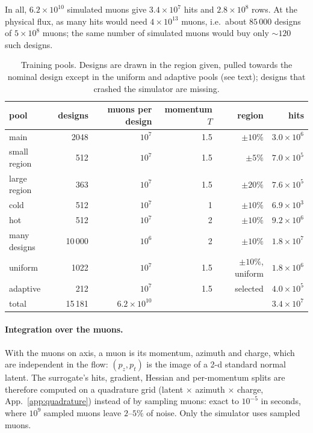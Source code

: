 \documentclass[11pt,a4paper]{article}
\begin{document}
In all, $6.2\times10^{10}$ simulated muons give $3.4\times10^7$ hits and $2.8\times10^8$ rows.
At the physical flux, as many hits would need $4\times10^{13}$ muons, i.e.\ about $85\,000$
designs of $5\times10^8$ muons; the same number of simulated muons would buy only $\sim120$
such designs.

\begin{table}[h]
\centering
\caption{Training pools. Designs are drawn in the region given, pulled towards the nominal
design except in the uniform and adaptive pools (see text); designs that crashed the simulator
are missing.}
\label{tab:pools}
\begin{tabular}{lrrrrr}
\toprule
pool & designs & muons per design & momentum $T$ & region & hits \\
\midrule
main           & 2048    & $10^7$ & 1.5 & $\pm10\%$ & $3.0\times10^6$ \\
small region   & 512     & $10^7$ & 1.5 & $\pm5\%$  & $7.0\times10^5$ \\
large region   & 363     & $10^7$ & 1.5 & $\pm20\%$ & $7.6\times10^5$ \\
cold           & 512     & $10^7$ & 1   & $\pm10\%$ & $6.9\times10^3$ \\
hot            & 512     & $10^7$ & 2   & $\pm10\%$ & $9.2\times10^6$ \\
many designs   & 10\,000 & $10^6$ & 2   & $\pm10\%$ & $1.8\times10^7$ \\
uniform        & 1022    & $10^7$ & 1.5 & $\pm10\%$, uniform & $1.8\times10^6$ \\
adaptive       & 212     & $10^7$ & 1.5 & selected  & $4.0\times10^5$ \\
\midrule
total          & 15\,181 & $6.2\times10^{10}$ & & & $3.4\times10^7$ \\
\bottomrule
\end{tabular}
\end{table}

\paragraph{Integration over the muons.}
With the muons on axis, a muon is its momentum, azimuth and charge, which are independent in the
flow: $(p_z,p_t)$ is the image of a 2-d standard normal latent. The surrogate's hits, gradient,
Hessian and per-momentum splits are therefore computed on a quadrature grid (latent $\times$
azimuth $\times$ charge, App.~\ref{app:quadrature}) instead of by sampling muons: exact to
$10^{-5}$ in seconds, where $10^9$ sampled muons leave $2$--$5\%$ of noise. Only the simulator
uses sampled muons.
\end{document}
